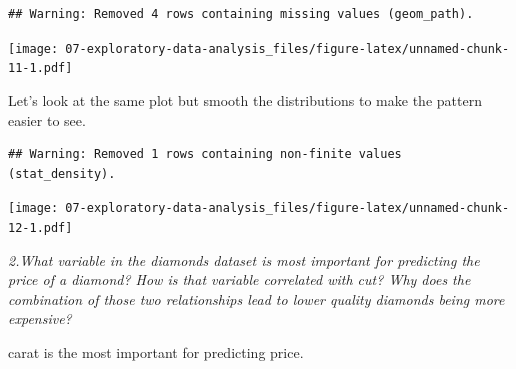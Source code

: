 \documentclass[]{book}
\newenvironment{Shaded}{\begin{snugshade}}{\end{snugshade}}
\newcommand{\DataTypeTok}[1]{\textcolor[rgb]{0.13,0.29,0.53}{#1}}
\newcommand{\DecValTok}[1]{\textcolor[rgb]{0.00,0.00,0.81}{#1}}
\newcommand{\FloatTok}[1]{\textcolor[rgb]{0.00,0.00,0.81}{#1}}
\newcommand{\KeywordTok}[1]{\textcolor[rgb]{0.13,0.29,0.53}{\textbf{#1}}}
\newcommand{\NormalTok}[1]{#1}
\newcommand{\OperatorTok}[1]{\textcolor[rgb]{0.81,0.36,0.00}{\textbf{#1}}}
\newcommand{\StringTok}[1]{\textcolor[rgb]{0.31,0.60,0.02}{#1}}
\theoremstyle{definition}
\theoremstyle{definition}
\theoremstyle{definition}
\theoremstyle{remark}
\begin{document}
\begin{verbatim}
## Warning: Removed 4 rows containing missing values (geom_path).
\end{verbatim}

\texttt{[image: 07-exploratory-data-analysis\_files/figure-latex/unnamed-chunk-11-1.pdf]}

Let's look at the same plot but smooth the distributions to make the
pattern easier to see.

\begin{Shaded}
\end{Shaded}

\begin{verbatim}
## Warning: Removed 1 rows containing non-finite values (stat_density).
\end{verbatim}

\texttt{[image: 07-exploratory-data-analysis\_files/figure-latex/unnamed-chunk-12-1.pdf]}

\emph{2.What variable in the diamonds dataset is most important for
predicting the price of a diamond? How is that variable correlated with
cut? Why does the combination of those two relationships lead to lower
quality diamonds being more expensive?}

carat is the most important for predicting price.
\end{document}
